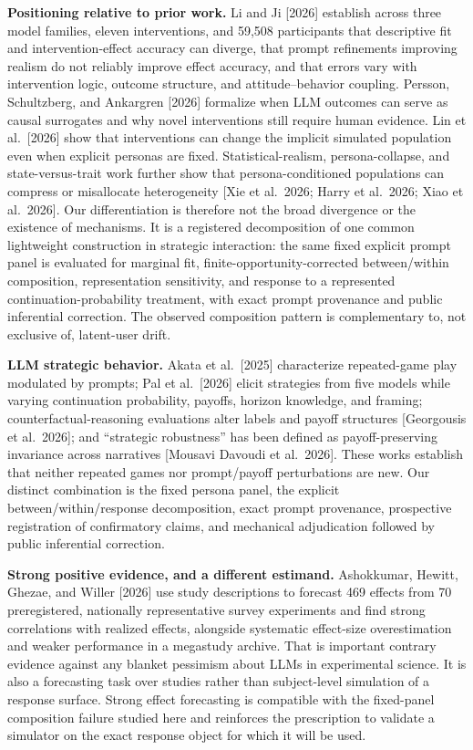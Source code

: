 \documentclass[
  11pt]{article}
\begin{document}
\textbf{Positioning relative to prior work.} Li and Ji {[}2026{]}
establish across three model families, eleven interventions, and 59,508
participants that descriptive fit and intervention-effect accuracy can
diverge, that prompt refinements improving realism do not reliably
improve effect accuracy, and that errors vary with intervention logic,
outcome structure, and attitude--behavior coupling. Persson,
Schultzberg, and Ankargren {[}2026{]} formalize when LLM outcomes can
serve as causal surrogates and why novel interventions still require
human evidence. Lin et al.~{[}2026{]} show that interventions can change
the implicit simulated population even when explicit personas are fixed.
Statistical-realism, persona-collapse, and state-versus-trait work
further show that persona-conditioned populations can compress or
misallocate heterogeneity {[}Xie et al.~2026; Harry et al.~2026; Xiao et
al.~2026{]}. Our differentiation is therefore not the broad divergence
or the existence of mechanisms. It is a registered decomposition of one
common lightweight construction in strategic interaction: the same fixed
explicit prompt panel is evaluated for marginal fit,
finite-opportunity-corrected between/within composition, representation
sensitivity, and response to a represented continuation-probability
treatment, with exact prompt provenance and public inferential
correction. The observed composition pattern is complementary to, not
exclusive of, latent-user drift.

\textbf{LLM strategic behavior.} Akata et al.~{[}2025{]} characterize
repeated-game play modulated by prompts; Pal et al.~{[}2026{]} elicit
strategies from five models while varying continuation probability,
payoffs, horizon knowledge, and framing; counterfactual-reasoning
evaluations alter labels and payoff structures {[}Georgousis et
al.~2026{]}; and ``strategic robustness'' has been defined as
payoff-preserving invariance across narratives {[}Mousavi Davoudi et
al.~2026{]}. These works establish that neither repeated games nor
prompt/payoff perturbations are new. Our distinct combination is the
fixed persona panel, the explicit between/within/response decomposition,
exact prompt provenance, prospective registration of confirmatory
claims, and mechanical adjudication followed by public inferential
correction.

\textbf{Strong positive evidence, and a different estimand.} Ashokkumar,
Hewitt, Ghezae, and Willer {[}2026{]} use study descriptions to forecast
469 effects from 70 preregistered, nationally representative survey
experiments and find strong correlations with realized effects,
alongside systematic effect-size overestimation and weaker performance
in a megastudy archive. That is important contrary evidence against any
blanket pessimism about LLMs in experimental science. It is also a
forecasting task over studies rather than subject-level simulation of a
response surface. Strong effect forecasting is compatible with the
fixed-panel composition failure studied here and reinforces the
prescription to validate a simulator on the exact response object for
which it will be used.
\end{document}

